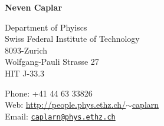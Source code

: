 \documentclass[11pt,letterpaper]{article}
\def\name{\textbf{Neven Caplar}}
\renewenvironment{itemize}{
  \begin{list}{}{
    \setlength{\leftmargin}{1.5em}
    \setlength{\itemsep}{0.15em}
    \setlength{\parskip}{0pt}
    \setlength{\parsep}{0.25em}
  }
}{
  \end{list}
}
\begin{document}
{\huge \name}


\bigskip

\begin{minipage}[t]{0.495\textwidth}
  Department of Phyiscs \\
  Swiss Federal Institute of Technology \\
  8093-Zurich	 \\
  Wolfgang-Pauli Strasse 27 \\
  HIT J-33.3
\end{minipage}
\begin{minipage}[t]{0.495\textwidth}
  Phone: +41 44 63 33826 \\
  Web: \href{ http://people.phys.ethz.ch/~caplarn}{ http://people.phys.ethz.ch/$\sim$caplarn} \\
  Email: \href{caplarn@phys.ethz.ch}{\nolinkurl{caplarn@phys.ethz.ch}} \\
\end{minipage}



%
\end{document}

